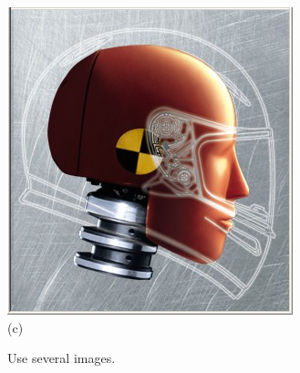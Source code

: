 \documentclass[sponsored]{acmsiggraph}
\begin{document}
\begin{figure}[t]
    \parbox{0.3\linewidth}{\centering \includegraphics[width=\linewidth]{images/Dummy} \\ (c)}
    \caption{\label{fig:SeveralImages} 
    Use several images.}
\end{figure}



\end{document}
